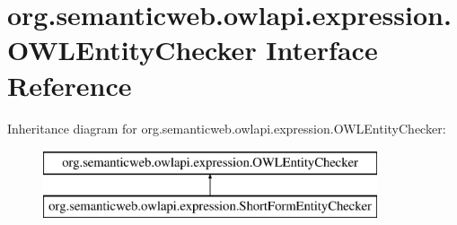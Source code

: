 \hypertarget{interfaceorg_1_1semanticweb_1_1owlapi_1_1expression_1_1_o_w_l_entity_checker}{\section{org.\-semanticweb.\-owlapi.\-expression.\-O\-W\-L\-Entity\-Checker Interface Reference}
\label{interfaceorg_1_1semanticweb_1_1owlapi_1_1expression_1_1_o_w_l_entity_checker}
}
Inheritance diagram for org.\-semanticweb.\-owlapi.\-expression.\-O\-W\-L\-Entity\-Checker\-:\begin{figure}[H]
\begin{center}
\leavevmode
\includegraphics[height=2.000000cm]{interfaceorg_1_1semanticweb_1_1owlapi_1_1expression_1_1_o_w_l_entity_checker}
\end{center}
\end{figure}
